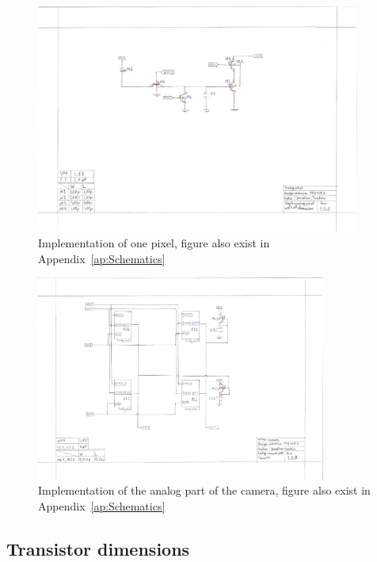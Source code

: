 \begin{figure}[htbp]
  \centering
  \includegraphics[width=0.95\textwidth]{figures/SchematicPixel}
  \caption{Implementation of one pixel, figure also exist in Appendix~\ref{ap:Schematics}}
  \label{fig:implpixel}
\end{figure}
\begin{figure}[htbp]
  \centering
  \includegraphics[width=0.85\textwidth]{figures/SchematicCamera}
  \caption{Implementation of the analog part of the camera, figure also exist in Appendix~\ref{ap:Schematics}}
  \label{fig:implcamera}
\end{figure}



\subsection{Transistor dimensions}

